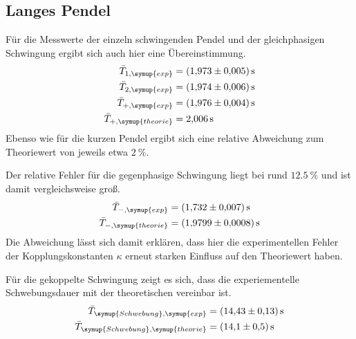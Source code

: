 \subsection{Langes Pendel}
Für die Messwerte der einzeln schwingenden Pendel und der gleichphasigen Schwingung ergibt sich auch hier eine Übereinstimmung. 
\begin{align*}
    \bar{T}_{1,\symup{exp}} &= \qty{1.973+-0.005}{\second} \\
    \bar{T}_{2,\symup{exp}} &= \qty{1.974+-0.006}{\second} \\
    \bar{T}_{+,\symup{exp}} &= \qty{1.976+-0.004}{\second} \\
    \bar{T}_{+,\symup{theorie}} &= \qty{2.006}{\second} 
\end{align*}
Ebenso wie für die kurzen Pendel ergibt sich eine relative Abweichung zum Theoriewert von jeweils etwa $\qty{2}{\percent}$.

Der relative Fehler für die gegenphasige Schwingung liegt bei rund $\qty{12,5}{\percent}$ und ist damit vergleichsweise groß.
\begin{align*}
    \bar{T}_{-,\symup{exp}} &= \qty{1.732+-0.007}{\second} \\
    \bar{T}_{-,\symup{theorie}} &= \qty{1.9799+-0.0008}{\second}
\end{align*}
Die Abweichung lässt sich damit erklären, dass hier die experimentellen Fehler der Kopplungskonstanten $\kappa$ erneut starken Einfluss auf 
den Theoriewert haben.

Für die gekoppelte Schwingung zeigt es sich, dass die experiementelle Schwebungsdauer mit der theoretischen vereinbar ist.
\begin{align*}
    \bar{T}_{\symup{Schwebung},\symup{exp}} &= \qty{14.43+-0.13}{\second} \\
    \bar{T}_{\symup{Schwebung},\symup{theorie}} &= \qty{14.1+-0.5}{\second}
\end{align*}

